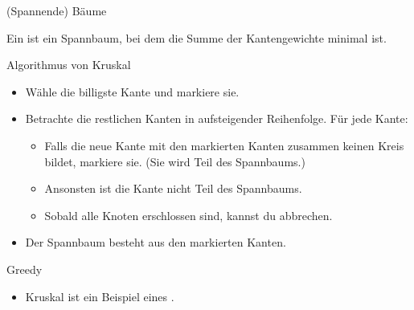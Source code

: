 \begin{frame}[text=large]{(Spannende) Bäume}
  \begin{concept}
    Ein  ist ein Spannbaum, bei dem die Summe der Kantengewichte minimal ist.
  \end{concept}
\end{frame}

\begin{frame}{Algorithmus von Kruskal}
  \begin{itemize}
    \item Wähle die billigste Kante und markiere sie.
    \item Betrachte die restlichen Kanten in aufsteigender Reihenfolge. Für jede Kante:
    \begin{itemize}
      \item Falls die neue Kante mit den markierten Kanten zusammen keinen Kreis bildet, markiere sie.
        (Sie wird Teil des Spannbaums.)
      \item Ansonsten ist die Kante nicht Teil des Spannbaums.
      \item Sobald alle Knoten erschlossen sind, kannst du abbrechen.
    \end{itemize}
    \item Der Spannbaum besteht aus den markierten Kanten.
  \end{itemize}
\end{frame}

\begin{frame}[text=large]{Greedy}
  \begin{itemize}
    \item Kruskal ist ein Beispiel eines .
  \end{itemize}
\end{frame}

